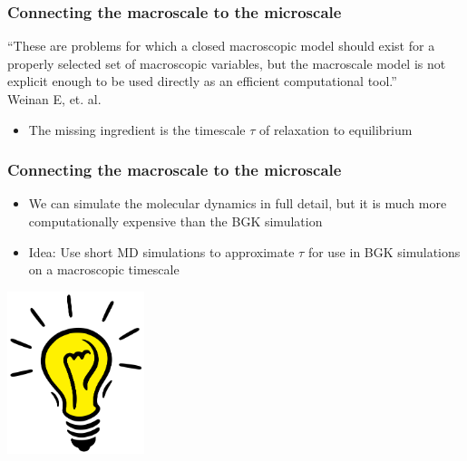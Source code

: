 \documentclass{beamer}
\begin{document}
\begin{frame}
\frametitle{Connecting the macroscale to the microscale}
``These are problems for which a closed macroscopic model should exist for a properly selected set of macroscopic variables, but the macroscale model is not explicit enough to be used directly as an efficient computational tool.''\\\hfill Weinan E, et. al.
\vspace{1em}
\begin{itemize}
\item The missing ingredient is the timescale $\tau$ of relaxation to equilibrium\vspace{1em}

\end{itemize}
\end{frame}


\begin{frame}
\frametitle{Connecting the macroscale to the microscale}
\begin{itemize}
\item We can simulate the molecular dynamics in full detail, but it is much more computationally expensive than the BGK simulation\end{itemize}



\begin{itemize}
\item Idea: Use short MD simulations to approximate $\tau$ for use in BGK simulations on a macroscopic timescale
\end{itemize}
\begin{center}\includegraphics[width=0.3\textwidth]{lightbulb.jpg}\end{center}
\end{frame}
\end{document}
